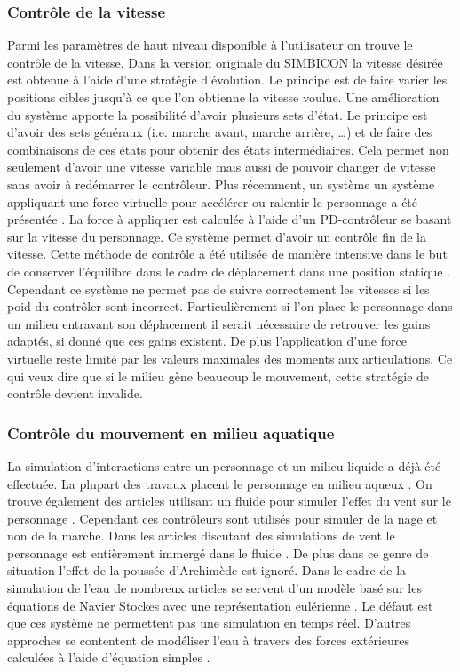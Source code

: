 \documentclass{llncs}
\begin{document}
	\subsubsection{Contrôle de la vitesse}
Parmi les paramètres de haut niveau disponible à l'utilisateur on trouve le contrôle de la vitesse. Dans la version originale du SIMBICON la vitesse désirée est obtenue à l'aide d'une stratégie d'évolution. Le principe est de faire varier les positions cibles jusqu'à ce que l'on obtienne la vitesse voulue. Une amélioration du système \cite{coros2009robust} apporte la possibilité d'avoir plusieurs sets d'état. Le principe est d'avoir des sets généraux (i.e. marche avant, marche arrière, …) et de faire des combinaisons de ces états pour obtenir des états intermédiaires. Cela permet non seulement d'avoir une vitesse variable mais aussi de pouvoir changer de vitesse sans avoir à redémarrer le contrôleur. Plus récemment, un système un système appliquant une force virtuelle pour  accélérer ou ralentir le personnage a été présentée \cite{coros2010generalized}. La force à appliquer est calculée à l'aide d'un PD-contrôleur se basant sur  la vitesse du personnage. Ce système permet d'avoir un contrôle fin de la vitesse. Cette méthode de contrôle a été utilisée de manière intensive dans le but de conserver l'équilibre dans le cadre de déplacement dans une position statique \cite{geijtenbeek2012simple}. Cependant ce système ne permet pas de suivre correctement les vitesses si les poid du contrôler sont incorrect. Particulièrement si l'on place le personnage dans un milieu entravant son déplacement il serait nécessaire de retrouver les gains adaptés, si donné que ces gains existent. De plus l'application d'une force virtuelle reste limité par les valeurs maximales des moments aux articulations. Ce qui veux dire que si le milieu gène beaucoup le mouvement, cette stratégie de contrôle devient invalide.

	\subsubsection{Contrôle du mouvement en milieu aquatique}
La simulation d'interactions entre un personnage et un milieu liquide a déjà été effectuée. La plupart des travaux placent le personnage en milieu aqueux \cite{yang2004layered,kwatra2010fluid,tan2011articulated,si2014realistic}. On trouve également des articles utilisant un fluide pour simuler l'effet du vent sur le personnage \cite{lentine2011creature}. Cependant ces contrôleurs sont utilisés pour simuler de la nage et non de la marche. Dans les articles discutant des simulations de vent le personnage est entièrement immergé dans le fluide \cite{lentine2011creature}. De plus dans ce genre de situation l'effet de la poussée d'Archimède est ignoré. Dans le cadre de la simulation de l'eau de nombreux articles se servent d'un modèle basé sur les équations de Navier Stockes \cite{stam1999stable} avec une représentation eulérienne \cite{si2014realistic}. Le défaut est que ces système ne permettent pas une simulation en temps réel. D'autres approches se contentent de modéliser l'eau à travers des forces extérieures calculées à l'aide d'équation simples \cite{yang2004layered}.
\end{document}

